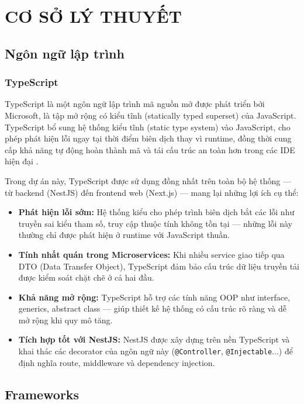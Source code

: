 \documentclass[a4paper,12pt]{extreport}
\begin{document}
\chapter{CƠ SỞ LÝ THUYẾT}

\section{Ngôn ngữ lập trình}

\subsection{TypeScript}

TypeScript là một ngôn ngữ lập trình mã nguồn mở được phát triển bởi Microsoft, là tập mở rộng có kiểu tĩnh (statically typed superset) của JavaScript. TypeScript bổ sung hệ thống kiểu tĩnh (static type system) vào JavaScript, cho phép phát hiện lỗi ngay tại thời điểm biên dịch thay vì runtime, đồng thời cung cấp khả năng tự động hoàn thành mã và tái cấu trúc an toàn hơn trong các IDE hiện đại \cite{nestjs-docs}.

Trong dự án này, TypeScript được sử dụng đồng nhất trên toàn bộ hệ thống — từ backend (NestJS) đến frontend web (Next.js) — mang lại những lợi ích cụ thể:

\begin{itemize}
    \item \textbf{Phát hiện lỗi sớm:} Hệ thống kiểu cho phép trình biên dịch bắt các lỗi như truyền sai kiểu tham số, truy cập thuộc tính không tồn tại — những lỗi này thường chỉ được phát hiện ở runtime với JavaScript thuần.
    \item \textbf{Tính nhất quán trong Microservices:} Khi nhiều service giao tiếp qua DTO (Data Transfer Object), TypeScript đảm bảo cấu trúc dữ liệu truyền tải được kiểm soát chặt chẽ ở cả hai đầu.
    \item \textbf{Khả năng mở rộng:} TypeScript hỗ trợ các tính năng OOP như interface, generics, abstract class — giúp thiết kế hệ thống có cấu trúc rõ ràng và dễ mở rộng khi quy mô tăng.
    \item \textbf{Tích hợp tốt với NestJS:} NestJS được xây dựng trên nền TypeScript và khai thác các decorator của ngôn ngữ này (\texttt{@Controller}, \texttt{@Injectable}...) để định nghĩa route, middleware và dependency injection.
\end{itemize}

\section{Frameworks}
\end{document}
